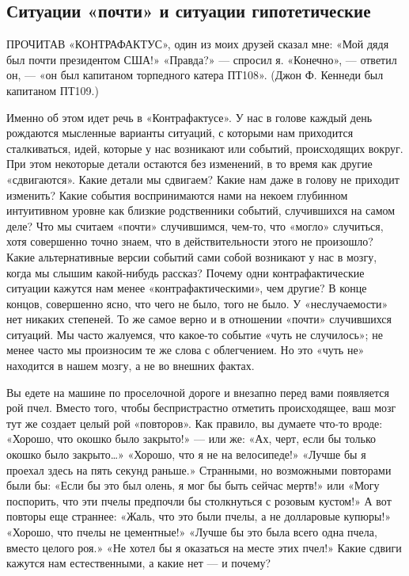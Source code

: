 \documentclass[../main.tex]{subfiles}
\begin{document}

\subsection{Ситуации «почти» и ситуации гипотетические}

ПРОЧИТАВ «КОНТРАФАКТУС», один из моих друзей сказал мне: «Мой дядя был почти президентом США!» «Правда?» --- спросил я. «Конечно», --- ответил он, --- «он был капитаном торпедного катера ПТ108». (Джон Ф. Кеннеди был капитаном ПТ109.)

Именно об этом идет речь в «Контрафактусе». У нас в голове каждый день рождаются мысленные варианты ситуаций, с которыми нам приходится сталкиваться, идей, которые у нас возникают или событий, происходящих вокруг. При этом некоторые детали остаются без изменений, в то время как другие «сдвигаются». Какие детали мы сдвигаем? Какие нам даже в голову не приходит изменить? Какие события воспринимаются нами на некоем глубинном интуитивном уровне как близкие родственники событий, случившихся на самом деле? Что мы считаем «почти» случившимся, чем-то, что «могло» случиться, хотя совершенно точно знаем, что в действительности этого не произошло? Какие альтернативные версии событий сами собой возникают у нас в мозгу, когда мы слышим какой-нибудь рассказ? Почему одни контрафактические ситуации кажутся нам менее «контрафактическими», чем другие? В конце концов, совершенно ясно, что чего не было, того не было. У «неслучаемости» нет никаких степеней. То же самое верно и в отношении «почти» случившихся ситуаций. Мы часто жалуемся, что какое-то событие «чуть не случилось»; не менее часто мы произносим те же слова с облегчением. Но это «чуть не» находится в нашем мозгу, а не во внешних фактах.

Вы едете на машине по проселочной дороге и внезапно перед вами появляется рой пчел. Вместо того, чтобы беспристрастно отметить происходящее, ваш мозг тут же создает целый рой «повторов». Как правило, вы думаете что-то вроде: «Хорошо, что окошко было закрыто!» --- или же: «Ах, черт, если бы только окошко было закрыто\ldots» «Хорошо, что я не на велосипеде!» «Лучше бы я проехал здесь на пять секунд раньше.» Странными, но возможными повторами были бы: «Если бы это был олень, я мог бы быть сейчас мертв!» или «Могу поспорить, что эти пчелы предпочли бы столкнуться с розовым кустом!» А вот повторы еще страннее: «Жаль, что это были пчелы, а не долларовые купюры!» «Хорошо, что пчелы не цементные!» «Лучше бы это была всего одна пчела, вместо целого роя.» «Не хотел бы я оказаться на месте этих пчел!» Какие сдвиги кажутся нам естественными, а какие нет --- и почему?
\end{document}
